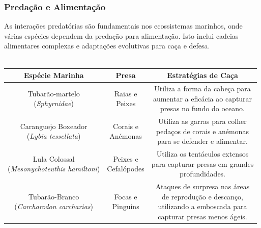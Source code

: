 \documentclass{report}
\begin{document}
\subsubsection{Predação e Alimentação}
As interações predatórias são fundamentais nos ecossistemas marinhos, onde várias espécies dependem da predação para alimentação. Isto inclui cadeias alimentares complexas e adaptações evolutivas para caça e defesa.
\\
\\
\begin{tabular}{|c|c|c|} \hline
    Espécie Marinha & Presa & Estratégias de Caça \\ \hline
    \makecell{Tubarão-martelo \\(\textit{Sphyrnidae})} & \makecell{Raias e \\Peixes} & \makecell{Utiliza a forma da cabeça para \\aumentar a eficácia ao capturar \\presas no fundo do oceano.} \\ \hline
    \makecell{Caranguejo Boxeador \\(\textit{Lybia tessellata})} & \makecell{Corais e \\Anémonas} & \makecell{Utiliza as garras para colher \\pedaços de corais e anémonas \\para se defender e alimentar.} \\ \hline
    \makecell{Lula Colossal \\(\textit{Mesonychoteuthis hamiltoni})} & \makecell{Peixes e \\Cefalópodes} & \makecell{Utiliza os tentáculos extensos \\para capturar presas em grandes \\profundidades.} \\ \hline
    \makecell{Tubarão-Branco \\(\textit{Carcharodon carcharias})} & \makecell{Focas e \\Pinguins} & \makecell{Ataques de surpresa nas áreas \\de reprodução e descanço, \\utilizando a emboscada para \\capturar presas menos ágeis.} \\ \hline
\end{tabular}
\\
\\
\end{document}
